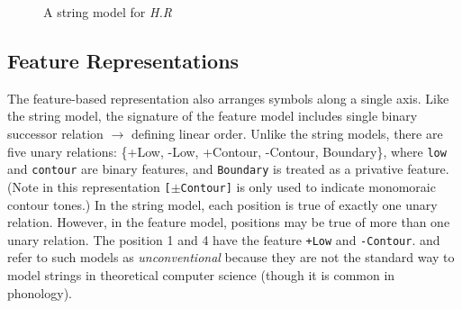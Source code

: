 \begin{figure}[ht]
\begin{minipage}{.5\textwidth}
        
    \end{minipage}
    \caption{A string model for \textit{H.R}}
    \label{fig:model:str}
\end{figure}



\subsection{Feature Representations}
\label{sec:prelim.feature}


The feature-based representation also arranges symbols along a single axis.
Like the string model, the signature of the feature model
includes single binary successor relation $\rightarrow$ defining linear order.
Unlike the string models, there are five unary relations:
\{+Low, -Low, +Contour, -Contour, Boundary\},
where \texttt{low} and \texttt{contour} are binary features, 
and \texttt{Boundary} is treated as a privative feature. (Note in this representation \texttt{[$\pm$Contour]} is only used to indicate monomoraic contour tones.)
In the string model, each position is true of exactly one unary relation.
However, in the feature model, positions may be true of more 
than one unary relation.
The position 1 and 4 have the feature \texttt{+Low} and \texttt{-Contour}.
\citet{strother2017using} and \citet{vu2018statistical} refer to such 
models as \textit{unconventional} because they are not the standard 
way to model strings in theoretical computer science (though it is 
common in phonology). 

